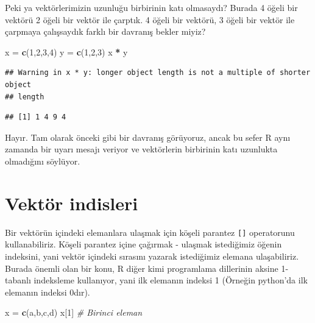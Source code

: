 \documentclass[
]{book}
\newenvironment{Shaded}{\begin{snugshade}}{\end{snugshade}}
\newcommand{\CommentTok}[1]{\textcolor[rgb]{0.56,0.35,0.01}{\textit{#1}}}
\newcommand{\DecValTok}[1]{\textcolor[rgb]{0.00,0.00,0.81}{#1}}
\newcommand{\KeywordTok}[1]{\textcolor[rgb]{0.13,0.29,0.53}{\textbf{#1}}}
\newcommand{\NormalTok}[1]{#1}
\newcommand{\OperatorTok}[1]{\textcolor[rgb]{0.81,0.36,0.00}{\textbf{#1}}}
\newcommand{\StringTok}[1]{\textcolor[rgb]{0.31,0.60,0.02}{#1}}
\begin{document}
Peki ya vektörlerimizin uzunluğu birbirinin katı olmasaydı? Burada 4 öğeli bir vektörü 2 öğeli bir vektör ile çarptık. 4 öğeli bir vektörü, 3 öğeli bir vektör ile çarpmaya çalışsaydık farklı bir davranış bekler miyiz?

\begin{Shaded}
\begin{Highlighting}[]
\NormalTok{x =}\StringTok{ }\KeywordTok{c}\NormalTok{(}\DecValTok{1}\NormalTok{,}\DecValTok{2}\NormalTok{,}\DecValTok{3}\NormalTok{,}\DecValTok{4}\NormalTok{)}
\NormalTok{y =}\StringTok{ }\KeywordTok{c}\NormalTok{(}\DecValTok{1}\NormalTok{,}\DecValTok{2}\NormalTok{,}\DecValTok{3}\NormalTok{)}
\NormalTok{x }\OperatorTok{*}\StringTok{ }\NormalTok{y}
\end{Highlighting}
\end{Shaded}

\begin{verbatim}
## Warning in x * y: longer object length is not a multiple of shorter object
## length
\end{verbatim}

\begin{verbatim}
## [1] 1 4 9 4
\end{verbatim}

Hayır. Tam olarak önceki gibi bir davranış görüyoruz, ancak bu sefer R aynı zamanda bir uyarı mesajı veriyor ve vektörlerin birbirinin katı uzunlukta olmadığını söylüyor.

\hypertarget{vektuxf6r-indisleri}{%
\section{Vektör indisleri}\label{vektuxf6r-indisleri}}

Bir vektörün içindeki elemanlara ulaşmak için köşeli parantez \texttt{{[}{]}} operatorunu kullanabiliriz. Köşeli parantez içine çağırmak - ulaşmak istediğimiz öğenin indeksini, yani vektör içindeki sırasını yazarak istediğimiz elemana ulaşabiliriz. Burada önemli olan bir konu, R diğer kimi programlama dillerinin aksine 1-tabanlı indeksleme kullanıyor, yani ilk elemanın indeksi 1 (Örneğin python'da ilk elemanın indeksi 0dır).

\begin{Shaded}
\begin{Highlighting}[]
\NormalTok{x =}\StringTok{ }\KeywordTok{c}\NormalTok{(}\StringTok{\textquotesingle{}a\textquotesingle{}}\NormalTok{,}\StringTok{\textquotesingle{}b\textquotesingle{}}\NormalTok{,}\StringTok{\textquotesingle{}c\textquotesingle{}}\NormalTok{,}\StringTok{\textquotesingle{}d\textquotesingle{}}\NormalTok{)}
\NormalTok{x[}\DecValTok{1}\NormalTok{] }\CommentTok{\# Birinci eleman}
\end{Highlighting}
\end{Shaded}
\end{document}
